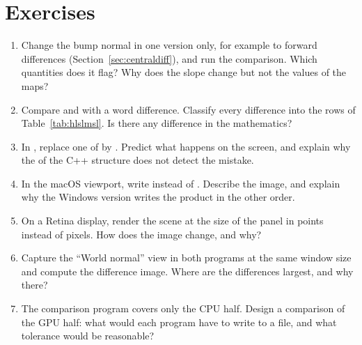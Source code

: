 \section{Exercises}
\begin{enumerate}[label=\textbf{C\arabic*.}]
\item Change the bump normal in one version only, for example to forward differences
(Section~\ref{sec:centraldiff}), and run the comparison. Which quantities does it flag? Why does
the slope change but not the values of the maps?
\item Compare  and  with a word difference.
Classify every difference into the rows of Table~\ref{tab:hlslmsl}. Is there any difference in the
mathematics?
\item In , replace one  of  by
. Predict what happens on the screen, and explain why the  of
the C++ structure does not detect the mistake.
\item In the macOS viewport, write  instead of . Describe the
image, and explain why the Windows version writes the product in the other order.
\item On a Retina display, render the scene at the size of the panel in points instead of pixels.
How does the image change, and why?
\item Capture the ``World normal'' view in both programs at the same window size and compute the
difference image. Where are the differences largest, and why there?
\item The comparison program covers only the CPU half. Design a comparison of the GPU half:
what would each program have to write to a file, and what tolerance would be reasonable?
\end{enumerate}
